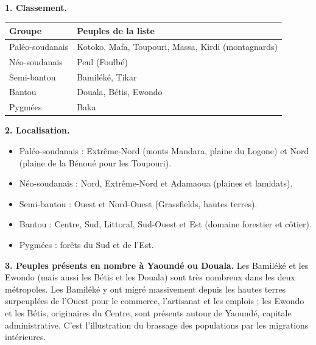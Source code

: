 \documentclass[11pt]{article}
\newcommand{\cle}[1]{{\popxbold\color{popdark}#1}}
\begin{document}
\begin{corrige}
\textbf{1. Classement.}
\begin{center}
\begin{tabularx}{\linewidth}{|l|X|}
\hline
\rowcolor{popblueL} Groupe & Peuples de la liste \\
\hline
Paléo-soudanais & Kotoko, Mafa, Toupouri, Massa, Kirdi (montagnards) \\
\hline
Néo-soudanais & Peul (Foulbé) \\
\hline
Semi-bantou & Bamiléké, Tikar \\
\hline
Bantou & Douala, Bétis, Ewondo \\
\hline
Pygmées & Baka \\
\hline
\end{tabularx}
\end{center}

\textbf{2. Localisation.}
\begin{itemize}
\item Paléo-soudanais : Extrême-Nord (monts Mandara, plaine du Logone) et Nord (plaine de la Bénoué pour les Toupouri).
\item Néo-soudanais : Nord, Extrême-Nord et Adamaoua (plaines et lamidats).
\item Semi-bantou : Ouest et Nord-Ouest (Grassfields, hautes terres).
\item Bantou : Centre, Sud, Littoral, Sud-Ouest et Est (domaine forestier et côtier).
\item Pygmées : forêts du Sud et de l'Est.
\end{itemize}

\textbf{3. Peuples présents en nombre à Yaoundé ou Douala.} Les Bamiléké et les Ewondo (mais aussi les Bétis et les Douala) sont très nombreux dans les deux métropoles. Les Bamiléké y ont migré massivement depuis les hautes terres surpeuplées de l'Ouest pour le commerce, l'artisanat et les emplois ; les Ewondo et les Bétis, originaires du Centre, sont présents autour de Yaoundé, capitale administrative. C'est l'illustration du \cle{brassage des populations} par les migrations intérieures.
\end{corrige}
\end{document}
